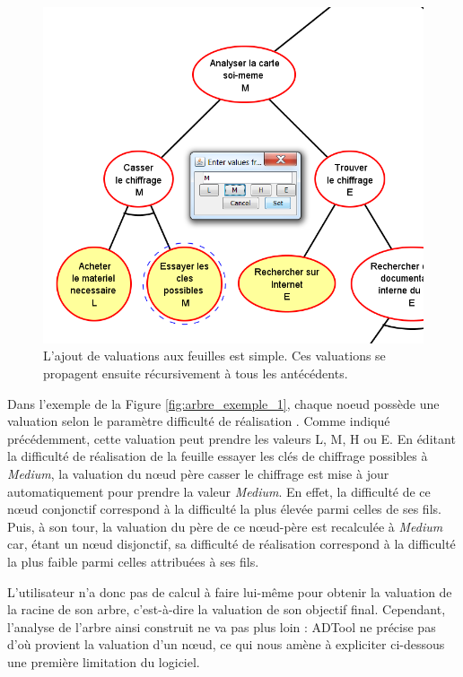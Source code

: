 	\begin{figure}[h]
        \centering
        \includegraphics[width=1\textwidth]{figure/adtool_add_values.png}
        \caption{L'ajout de valuations aux feuilles est simple. Ces valuations se propagent ensuite récursivement à tous les antécédents.}
        \label{fig:arbre_exemple_2}
    \end{figure}
	
	Dans l'exemple de la {\sc Figure} \ref{fig:arbre_exemple_1}, chaque noeud possède une valuation selon le paramètre \og difficulté de réalisation \fg{}. Comme indiqué précédemment, cette valuation peut prendre les valeurs L, M, H ou E. En éditant la difficulté de réalisation de la feuille \og essayer les clés de chiffrage possibles \fg{} à \emph{Medium}, la valuation du nœud père \og casser le chiffrage \fg{} est mise à jour automatiquement pour prendre la valeur \emph{Medium}. En effet, la difficulté de ce nœud conjonctif correspond à la difficulté la plus élevée parmi celles de ses fils. Puis, à son tour, la valuation du père de ce nœud-père est recalculée à \emph{Medium} car, étant un nœud disjonctif, sa difficulté de réalisation correspond à la difficulté la plus faible parmi celles attribuées à ses fils.
	
	L'utilisateur n'a donc pas de calcul à faire lui-même pour obtenir la valuation de la racine de son arbre, c'est-à-dire la valuation de son objectif final. Cependant, l'analyse de l'arbre ainsi construit ne va pas plus loin : ADTool ne précise pas d'où provient la valuation d'un nœud, ce qui nous amène à expliciter ci-dessous une première limitation du logiciel.\\

